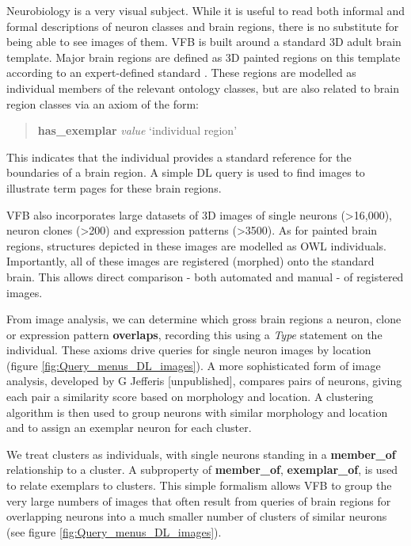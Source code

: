 \documentclass[runningheads,a4paper]{llncs}
\begin{document}
Neurobiology is a very visual subject.  While it is useful to read
both informal and formal descriptions of neuron classes and brain
regions, there is no substitute for being able to see images of them.
VFB is built around a standard 3D adult brain template.  Major brain
regions are defined as 3D painted regions on this template according to
an expert-defined standard \cite{pmid24559671}.  These regions are modelled as
individual members of the relevant ontology classes, but are also
related to brain region classes via an axiom of the form:

\begin{quote}
\textbf{has\_exemplar} \textit{value} `individual region'
\end{quote}

This indicates that the individual provides a standard reference for
the boundaries of a brain region.  A simple DL query is used to find
images to illustrate term pages for these brain regions.

VFB also incorporates large datasets of 3D images of single neurons
(\textgreater 16,000), neuron clones (\textgreater 200) and expression
patterns (\textgreater 3500). As for painted brain regions, structures
depicted in these images are modelled as OWL individuals.
Importantly, all of these images are registered (morphed) onto the
standard brain. This allows direct comparison - both automated and
manual  - of registered images.

From image analysis, we can determine which gross brain regions a
neuron, clone or expression pattern \textbf{overlaps}, recording this
using a \textit{Type} statement on the individual.  These axioms drive queries for
single neuron images by location (figure
\ref{fig:Query_menus_DL_images}). A more sophisticated form of image
analysis, developed by G Jefferis [unpublished], compares pairs of
neurons,  giving each pair a similarity score based on morphology
and location.  A clustering algorithm is then used to group neurons with
similar morphology and location and to assign an exemplar neuron for
each cluster.

We treat clusters as individuals, with single neurons standing in a
\textbf{member\_of} relationship to a cluster.  A subproperty of
\textbf{member\_of}, \textbf{exemplar\_of}, is used to relate
exemplars to clusters.  This simple formalism allows VFB to group the
very large numbers of images that often result from queries of brain
regions for overlapping neurons into a much smaller number of clusters
of similar neurons (see figure \ref{fig:Query_menus_DL_images}).
\end{document}

